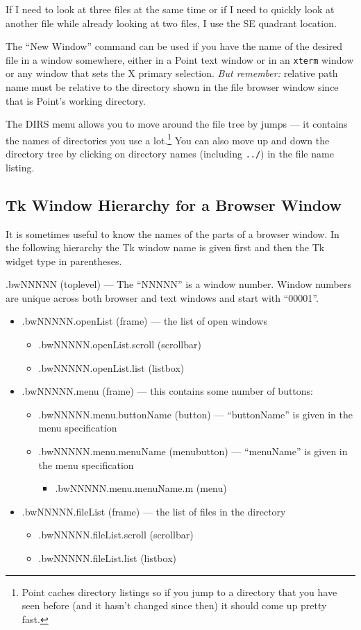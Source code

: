 If I need to look at three files at the same time or if I need
to quickly look at another file while already looking at two files,
I use the SE quadrant location.

The ``New Window'' command can be used if you have the name of the
desired file in a window somewhere, either in a Point text
window or in an {\tt xterm} window or any window that sets the
X primary selection.
{\it But remember:} relative path name must be relative to the directory
shown in the file browser window since that is Point's
working directory.

The DIRS menu allows you to move around the file tree
by jumps --- it contains the names of directories
you use a lot.\footnote{
Point caches directory listings so if you jump to a directory
that you have seen before (and it hasn't changed since then)
it should come up pretty fast.}
You can also move up and down the directory tree
by clicking on directory names (including {\tt ../}) in the file name listing.


\subsection{ Tk Window Hierarchy for a Browser Window}

It is sometimes useful to know the names of the parts of a browser
window.
In the following hierarchy the Tk window name is given first and
then the Tk widget type in parentheses.

.bwNNNNN (toplevel) --- The ``NNNNN'' is a window number.
	Window numbers are unique across both browser
	and text windows and start with ``00001''.
	\begin{itemize}
	\item .bwNNNNN.openList (frame) --- the list of open windows
		\begin{itemize}
		\item .bwNNNNN.openList.scroll (scrollbar)
		\item .bwNNNNN.openList.list (listbox)
		\end{itemize}
	\item .bwNNNNN.menu (frame) --- this contains some number of buttons:
		\begin{itemize}
		\item .bwNNNNN.menu.buttonName (button) ---
			``buttonName'' is given in the menu specification
		\item .bwNNNNN.menu.menuName (menubutton) ---
			``menuName'' is given in the menu specification
			\begin{itemize}
			\item .bwNNNNN.menu.menuName.m (menu)
			\end{itemize}
		\end{itemize}
	\item .bwNNNNN.fileList (frame) --- the list of files in
			the directory
		\begin{itemize}
		\item .bwNNNNN.fileList.scroll (scrollbar)
		\item .bwNNNNN.fileList.list (listbox)
		\end{itemize}
	\end{itemize}



